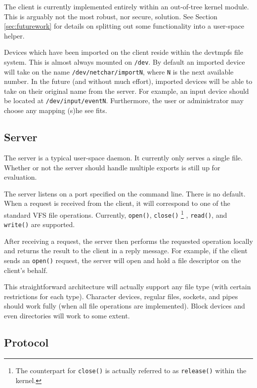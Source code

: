 \documentclass[11pt,twocolumn]{article}
\begin{document}
The client is currently implemented entirely within an out-of-tree kernel
module. This is arguably not the most robust, nor secure, solution. See
Section \ref{sec:futurework} for details on splitting out some functionality
into a user-space helper.

Devices which have been imported on the client reside within the
devtmpfs file system. This is almost always mounted on \texttt{/dev}. By
default an imported device will take on the name
\texttt{/dev/netchar/importN}, where \texttt{N} is the next available
number. In the future (and without much effort), imported devices will
be able to take on their original name from the server. For example, an
input device should be located at \texttt{/dev/input/eventN}. Furthermore,
the user or administrator may choose any mapping (s)he see fits.

\subsection{Server}

The server is a typical user-space daemon. It
currently only serves a single file. Whether or not the server should
handle multiple exports is still up for evaluation.

The server listens on a port specified on the command line. There is no
default. When a request is received from the client, it will correspond
to one of the standard VFS file operations. Currently, \texttt{open()},
\texttt{close()}
\footnote{The counterpart for \texttt{close()} is actually referred to
as \texttt{release()} within the kernel.}
, \texttt{read()}, and \texttt{write()} are supported.

After receiving a request, the server then performs the requested
operation locally and returns the result to the client in a reply
message. For example, if the client sends an \texttt{open()} request,
the server will open and hold a file descriptor on the client's behalf.

This straightforward architecture will actually support any file type
(with certain restrictions for each type). Character devices, regular
files, sockets, and pipes should work fully (when all file operations
are implemented). Block devices and even directories will work to some
extent.

\subsection{Protocol}
\end{document}
